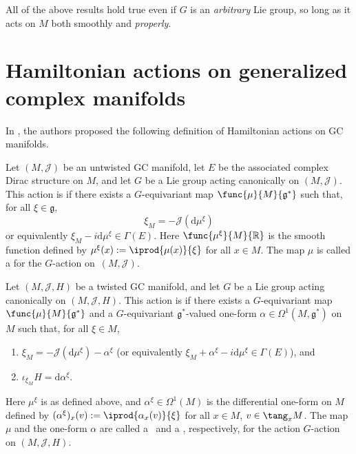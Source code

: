 \begin{Remark}
All of the above results hold true even if $G$ is an \emph{arbitrary} Lie group, so long as it acts on $M$ both smoothly and \emph{properly}.
\end{Remark}


\section{Hamiltonian actions on generalized complex manifolds}\label{section3}


In \cite{lintolman}, the authors proposed the following def\/inition of Hamiltonian actions on GC manifolds.


\begin{Definition}
\label{genhamactiondef}

Let $(M,\mathcal{J})$ be an untwisted GC manifold, let $E$ be the associated complex Dirac structure on $M$, and let $G$ be a Lie group acting canonically on $(M,\mathcal{J})$.  This action is  if there exists a $G$-equivariant map $\func{\mu}{M}{\mathfrak{g}^{\ast}}$ such that, for all $\xi \in \mathfrak{g}$,
\[
  \xi_M = - \mathcal{J} ( \mathrm{d} \mu^{\xi} )
\]
or equivalently $\xi_M - i \mathrm{d} \mu^{\xi} \in \Gamma(E)$.
Here $\func{\mu^{\xi}}{M}{\mathbb{R}}$ is the smooth function def\/ined by $\mu^{\xi}(x) := \iprod{\mu(x)}{\xi}$ for all $x \in M$.  The map $\mu$ is called a  for the $G$-action on~$(M, \mathcal{J})$.



Let $(M,\mathcal{J},H)$ be a twisted GC manifold, and let $G$ be a Lie group acting canonically on $(M,\mathcal{J},H)$.  This action is  if there exists a $G$-equivariant map $\func{\mu}{M}{\mathfrak{g}^{\ast}}$ and a $G$-equivariant $\mathfrak{g}^*$-valued one-form $\alpha \in \Omega^1(M, \mathfrak{g}^{\ast})$ on $M$ such that, for all $\xi \in M$,
\begin{enumerate}\itemsep=0pt
  \item $\xi_M = - \mathcal{J} ( \mathrm{d} \mu^{\xi} ) - \alpha^{\xi}$ (or equivalently $\xi_M + \alpha^{\xi} - i \mathrm{d} \mu^{\xi} \in \Gamma(E)$), and
  \item $\iota_{\xi_M} H = \mathrm{d} \alpha^{\xi}$.
\end{enumerate}
Here $\mu^{\xi}$ is as def\/ined above, and $\alpha^{\xi} \in \Omega^1(M)$ is the dif\/ferential one-form on $M$ def\/ined by $(\alpha^{\xi})_x (v) := \iprod{\alpha_x(v)}{\xi}$ for all $x \in M$, $v \in \tang_x M$.  The map $\mu$ and the one-form $\alpha$ are called a~ and a , respectively, for the action $G$-action on $(M, \mathcal{J}, H)$.
\end{Definition}


